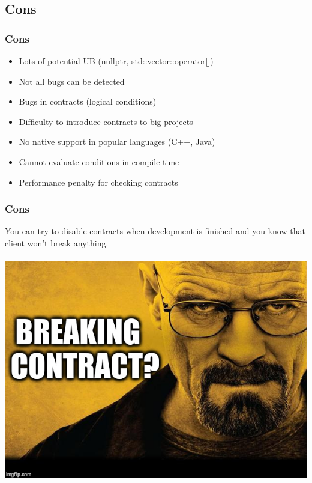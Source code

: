 \documentclass{beamer}
\begin{document}
\subsection{Cons}
\begin{frame}
\frametitle{Cons}
\begin{itemize}
  \item Lots of potential UB (nullptr, std::vector::operator[])
  \item Not all bugs can be detected
  \item Bugs in contracts (logical conditions)
  \item Difficulty to introduce contracts to big projects
  \item No native support in popular languages (C++, Java)
  \item Cannot evaluate conditions in compile time
  \item Performance penalty for checking contracts
\end{itemize}
\end{frame}

\begin{frame}
\frametitle{Cons}
\begin{center}
You can try to disable contracts when development is finished and you know that client won't break anything. \\~\\
\includegraphics[scale=0.35]{breaking_contract}
\end{center}
\end{frame}
\end{document}
